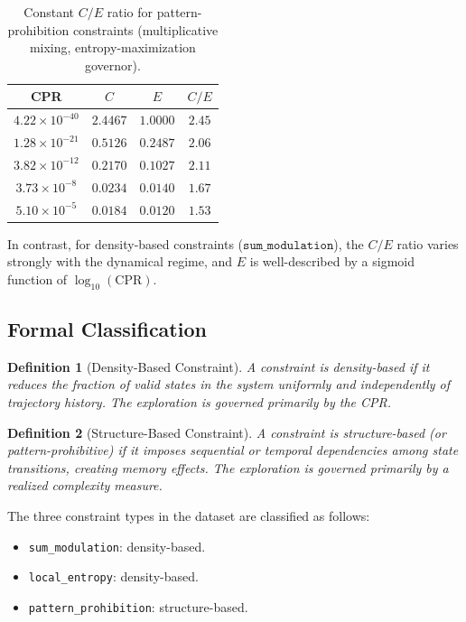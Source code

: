 \documentclass[12pt,a4paper]{article}
\newtheorem{definition}{Definition}
\begin{document}
\begin{table}[ht]
\centering
\caption{Constant $C/E$ ratio for pattern-prohibition constraints (multiplicative mixing, entropy-maximization governor).}
\label{tab:ce_ratio}
\begin{tabular}{cccc}
\toprule
CPR & $C$ & $E$ & $C/E$ \\
\midrule
$4.22\times10^{-40}$ & $2.4467$ & $1.0000$ & $2.45$ \\
$1.28\times10^{-21}$ & $0.5126$ & $0.2487$ & $2.06$ \\
$3.82\times10^{-12}$ & $0.2170$ & $0.1027$ & $2.11$ \\
$3.73\times10^{-8}$  & $0.0234$ & $0.0140$ & $1.67$ \\
$5.10\times10^{-5}$  & $0.0184$ & $0.0120$ & $1.53$ \\
\bottomrule
\end{tabular}
\end{table}

In contrast, for density-based constraints ($\texttt{sum\_modulation}$), the $C/E$ ratio varies strongly with the dynamical regime, and $E$ is well-described by a sigmoid function of $\log_{10}(\mathrm{CPR})$.

\subsection{Formal Classification}

\begin{definition}[Density-Based Constraint]
A constraint is \emph{density-based} if it reduces the fraction of valid states in the system uniformly and independently of trajectory history. The exploration is governed primarily by the CPR.
\end{definition}

\begin{definition}[Structure-Based Constraint]
A constraint is \emph{structure-based} (or \emph{pattern-prohibitive}) if it imposes sequential or temporal dependencies among state transitions, creating memory effects. The exploration is governed primarily by a realized complexity measure.
\end{definition}

The three constraint types in the dataset are classified as follows:
\begin{itemize}
    \item \texttt{sum\_modulation}: density-based.
    \item \texttt{local\_entropy}: density-based.
    \item \texttt{pattern\_prohibition}: structure-based.
\end{itemize}
\end{document}
